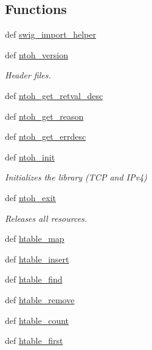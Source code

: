 \subsection*{Functions}
\begin{DoxyCompactItemize}
\item 
def \hyperlink{namespacelibntoh_a20a40d2e70bce861f694525f66632730}{swig\-\_\-import\-\_\-helper}
\item 
def \hyperlink{namespacelibntoh_aaac2d93f6819e10075e65ad7a5eb6e9d}{ntoh\-\_\-version}
\begin{DoxyCompactList}\small\item\em Header files. \end{DoxyCompactList}\item 
def \hyperlink{namespacelibntoh_a458eef17394e38c8f98d09b1668485cd}{ntoh\-\_\-get\-\_\-retval\-\_\-desc}
\item 
def \hyperlink{namespacelibntoh_a768a0989fd47dcb74a6d3bb44351ec99}{ntoh\-\_\-get\-\_\-reason}
\item 
def \hyperlink{namespacelibntoh_a4fc0c3f6a2d347f7b84aa3d14ae1f7ed}{ntoh\-\_\-get\-\_\-errdesc}
\item 
def \hyperlink{namespacelibntoh_ada1514e5ee06acbcbfedd22bb987c069}{ntoh\-\_\-init}
\begin{DoxyCompactList}\small\item\em Initializes the library (T\-C\-P and I\-Pv4) \end{DoxyCompactList}\item 
def \hyperlink{namespacelibntoh_ac9165058dd973c10bde158e460e4c9d0}{ntoh\-\_\-exit}
\begin{DoxyCompactList}\small\item\em Releases all resources. \end{DoxyCompactList}\item 
def \hyperlink{namespacelibntoh_aa91a885d8d7ba4291e9cc96705cae181}{htable\-\_\-map}
\item 
def \hyperlink{namespacelibntoh_af46c15cb1ed2edc8c2912d2b1a64991f}{htable\-\_\-insert}
\item 
def \hyperlink{namespacelibntoh_ab95caa8a0029dab512ef3eb15e8d36bb}{htable\-\_\-find}
\item 
def \hyperlink{namespacelibntoh_a7ccca7c54d8609338039bc623aceab5d}{htable\-\_\-remove}
\item 
def \hyperlink{namespacelibntoh_a0f364f40bae584ade53756aca2edfa19}{htable\-\_\-count}
\item 
def \hyperlink{namespacelibntoh_a11cfd368af0354db7e427354c34d30da}{htable\-\_\-first}

\end{DoxyCompactItemize}
